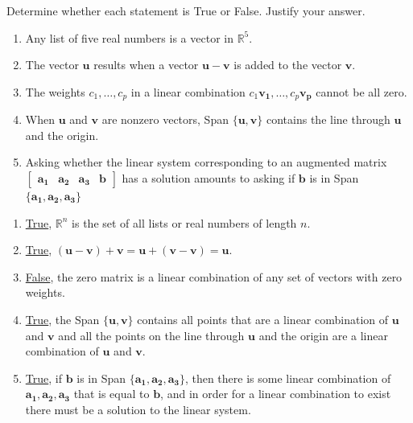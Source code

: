 \documentclass{../mathhomework}
\newcommand{\R}{\mathbb{R}}  %
\newcommand{\Vect}[1]{\pmb{#1}}
\begin{document}
\begin{problem}[1.3\#24]
    Determine whether each statement is True or False. Justify your answer.
    \begin{enumerate}[label=(\alph*)]
        \item Any list of five real numbers is a vector in $\R^5$.
        \item The vector $\Vect{u}$ results when a vector $\Vect{u} - \Vect{v}$ is added to the vector $\Vect{v}$.
        \item The weights $c_1,\ldots,c_p$ in a linear combination $c_1\Vect{v_1}, \ldots, c_p\Vect{v_p}$ cannot be all zero.
        \item When $\Vect{u}$ and $\Vect{v}$ are nonzero vectors, Span $\{\Vect{u}, \Vect{v}\}$ contains the line through $\Vect{u}$ and the origin.
        \item Asking whether the linear system corresponding to an augmented matrix $\begin{bmatrix}\Vect{a_1} & \Vect{a_2} & \Vect{a_3} & \Vect{b}\end{bmatrix}$ has a solution amounts to asking if $\Vect{b}$ is in Span $\{\Vect{a_1}, \Vect{a_2}, \Vect{a_3}\}$
    \end{enumerate}

    \begin{solution}
        \begin{enumerate}[label=(\alph*)]
            \item \underline{True}, $\R^n$ is the set of all lists or real numbers of length $n$.
            \item \underline{True}, $(\Vect{u} - \Vect{v}) + \Vect{v} = \Vect{u} + (\Vect{v} - \Vect{v}) = \Vect{u}$. 
            \item \underline{False}, the zero matrix is a linear combination of any set of vectors with zero weights.
            \item \underline{True}, the Span $\{\Vect{u}, \Vect{v}\}$ contains all points that are a linear combination of $\Vect{u}$ and $\Vect{v}$ and all the points on the line through $\Vect{u}$ and the origin are a linear combination of $\Vect{u}$ and $\Vect{v}$.
            \item \underline{True}, if $\Vect{b}$ is in Span $\{\Vect{a_1}, \Vect{a_2}, \Vect{a_3}\}$, then there is some linear combination of $\Vect{a_1}, \Vect{a_2}, \Vect{a_3}$ that is equal to $\Vect{b}$, and in order for a linear combination to exist there must be a solution to the linear system.
        \end{enumerate}
    \end{solution}
\end{problem}
\end{document}
